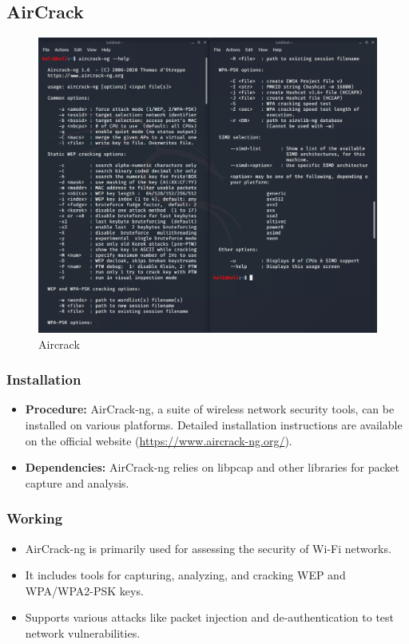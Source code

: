 \documentclass[11pt]{article}
\begin{document}
\subsection{AirCrack}
\begin{figure}[H]
	\centering
	\includegraphics[width=.95\textwidth]{aircrackng/aircrackng_3.jpg}
	\caption{Aircrack}
\end{figure}

\subsubsection{Installation}
\begin{itemize}
	\item \textbf{Procedure:} AirCrack-ng, a suite of wireless network security tools, can be installed on various platforms. Detailed installation instructions are available on the official website (\url{https://www.aircrack-ng.org/}).
	\item \textbf{Dependencies:} AirCrack-ng relies on libpcap and other libraries for packet capture and analysis.
\end{itemize}

\subsubsection{Working}
\begin{itemize}
	\item AirCrack-ng is primarily used for assessing the security of Wi-Fi networks.
	\item It includes tools for capturing, analyzing, and cracking WEP and WPA/WPA2-PSK
	      keys.
	\item Supports various attacks like packet injection and de-authentication to test
	      network vulnerabilities.
\end{itemize}
\end{document}
